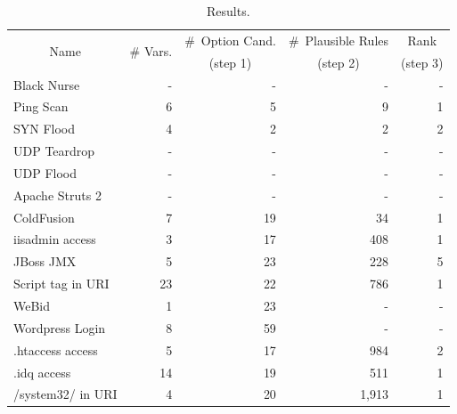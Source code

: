 \documentclass[sigconf,review, anonymous]{acmart}
\begin{document}
\setlength{\tabcolsep}{3pt}
\begin{table}[h!]
  \small
  \caption{\label{table:results}Results.}
  \vspace{-2ex}
  \centering
  \begin{tabular}{lrrrr}
    \toprule
    \multicolumn{1}{c}{\multirow{2}{*}{Name}} &
    \multicolumn{1}{c}{\multirow{2}{*}{\# Vars.}} &
    \#~Option Cand. &
    \#~Plausible Rules &    
    \multicolumn{1}{c}{Rank} \\

     &
    \multicolumn{1}{c}{} &
    \multicolumn{1}{c}{(step 1)} &
    \multicolumn{1}{c}{(step 2)} &    
    \multicolumn{1}{c}{(step 3)} \\

    \midrule
    Black Nurse & - & - & - & - \\    
    Ping Scan & 6 & 5 & 9 & 1 \\
    SYN Flood & 4 & 2 & 2 & 2 \\
    UDP Teardrop & - & - & - & - \\
    UDP Flood & - & - & - & - \\
    \midrule
    Apache Struts 2 & - & - & - & - \\
    ColdFusion & 7 & 19 & 34 & 1\\
    iisadmin access & 3 & 17 & 408 & 1 \\        
    JBoss JMX & 5 & 23 & 228 & 5 \\
    Script tag in URI & 23 & 22 & 786 & 1 \\
    WeBid & 1 & 23 & - & -\\    
    Wordpress Login & 8 & 59 & - & - \\
    .htaccess access & 5 & 17 & 984 & 2\\
    .idq access & 14 & 19 & 511 & 1 \\
    /system32/ in URI & 4 & 20 & 1,913 & 1 \\
    \bottomrule
  \end{tabular}
\end{table}
\end{document}
